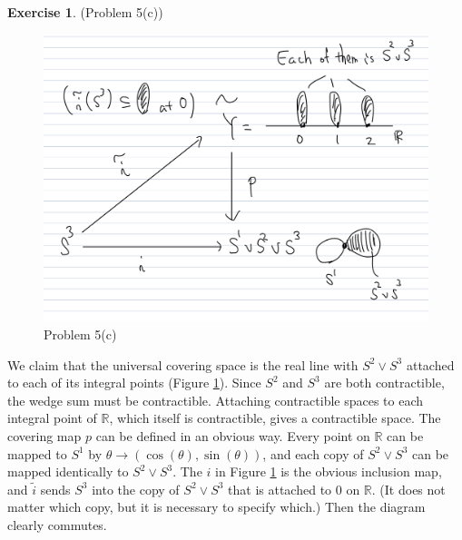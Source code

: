 \documentclass[12pt, psamsfonts]{amsart}
\theoremstyle{definition}
\newtheorem*{exer}{Exercise}
\theoremstyle{remark}
\numberwithin{equation}{section}
\begin{document}
\begin{exer}{(Problem 5(c))}
  \begin{figure}[!htb]
    \includegraphics[width=.8\linewidth]{problem5_c.jpeg}
    \caption{Problem 5(c)}
    \label{fig:5c}
  \end{figure}
  We claim that the universal covering space is the real line with $S^2 \vee S^3$ attached to each of its integral points (Figure \ref{fig:5c}).
  Since $S^2$ and $S^3$ are both contractible, the wedge sum must be contractible.
  Attaching contractible spaces to each integral point of $\mathbb{R}$, which itself is contractible, gives a contractible space.
  The covering map $p$ can be defined in an obvious way.
  Every point on $\mathbb{R}$ can be mapped to $S^1$ by $\theta \rightarrow (\cos(\theta), \sin(\theta))$, and each copy of $S^2 \vee S^3$ can be mapped identically to $S^2 \vee S^3$.
  The $i$ in Figure \ref{fig:5c} is the obvious inclusion map, and $\tilde{i}$ sends $S^3$ into the copy of $S^2 \vee S^3$ that is attached to 0 on $\mathbb{R}$.
  (It does not matter which copy, but it is necessary to specify which.)
  Then the diagram clearly commutes.


\end{exer}
\end{document}
